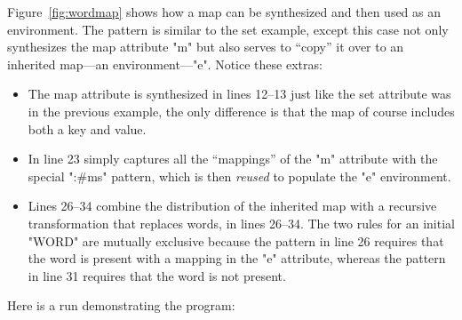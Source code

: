 \documentclass[12pt]{article} %
\begin{document}
\begin{example}\label{ex:wordmap}
  Figure~\ref{fig:wordmap} shows how a map can be synthesized and then used as an environment. The
  pattern is similar to the set example, except this case not only synthesizes the map attribute "m"
  but also serves to ``copy'' it over to an inherited map---an environment---"e". Notice these
  extras:
  \begin{itemize}

  \item The map attribute is synthesized in lines 12--13 just like the set attribute was in the
    previous example, the only difference is that the map of course includes both a key and value.

  \item In line 23 simply captures all the ``mappings'' of the "m" attribute with the special
    ":#ms" pattern, which is then \emph{reused} to populate the "e" environment.

  \item Lines 26--34 combine the distribution of the inherited map with a recursive transformation
    that replaces words, in lines 26--34. The two rules for an initial "WORD" are mutually exclusive
    because the pattern in line 26 requires that the word is present with a mapping in the "e"
    attribute, whereas the pattern in line 31 requires that the word is not present.

  \end{itemize}
  Here is a run demonstrating the program:
\end{example}
\end{document}
